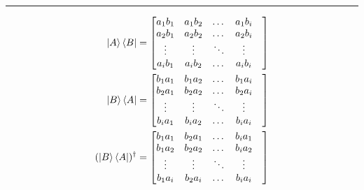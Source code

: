 \documentclass[12pt, oneside]{article}
\newenvironment{answer}
  {\vspace*{0.2cm} \rule{12cm}{0.02cm} \vspace*{0.2cm}}
  {\vspace*{0.2cm}}
\begin{document}
\begin{enumerate}
\begin{enumerate}
    \begin{answer}
      \begin{align*}
        \ket{A}\bra{B} &=\begin{bmatrix}
                            a_1b_1 & a_1b_2 & \dots  & a_1b_i &\\
                            a_2b_1 & a_2b_2 & \dots  & a_2b_i &\\
                            \vdots & \vdots & \ddots & \vdots &\\
                            a_ib_1 & a_ib_2 &  \dots & a_ib_i &
                         \end{bmatrix}\\
         \ket{B}\bra{A} &=\begin{bmatrix}
                             b_1a_1 & b_1a_2 & \dots  & b_1a_i &\\
                             b_2a_1 & b_2a_2 & \dots  & b_2a_i &\\
                             \vdots & \vdots & \ddots & \vdots &\\
                             b_ia_1 & b_ia_2 &  \dots & b_ia_i &
                          \end{bmatrix}\\
          (\ket{B}\bra{A})^\dagger &=\begin{bmatrix}
                                      b_1a_1 & b_2a_1 & \dots  & b_ia_1 &\\
                                      b_1a_2 & b_2a_2 & \dots  & b_ia_2 &\\
                                      \vdots & \vdots & \ddots & \vdots &\\
                                      b_1a_i & b_2a_i &  \dots & b_ia_i &
                                   \end{bmatrix}\\
      \end{align*}
    \end{answer}

  \end{enumerate}
\end{enumerate}
\end{document}

